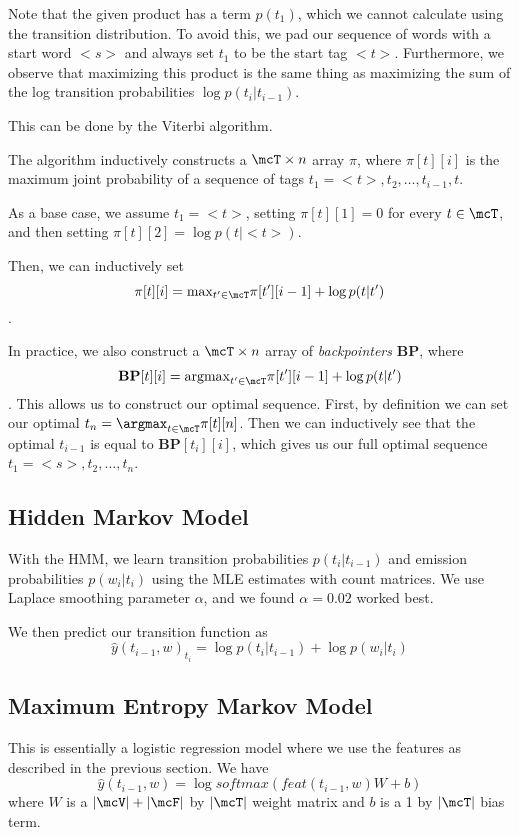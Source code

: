 \documentclass[11pt]{article}
\begin{document}
Note that the given product has a term $p(t_1)$, which we cannot calculate using the transition distribution. To avoid this, we pad our sequence of words with a start word $<s>$ and always set $t_1$ to be the start tag $<t>$. Furthermore, we observe that maximizing this product is the same thing as maximizing the sum of the log transition probabilities $\log p(t_i | t_{i-1})$. 

This can be done by the Viterbi algorithm. 

The algorithm inductively constructs a $\mcT \times n$ array $\pi$, where $\pi[t][i]$ is the maximum joint probability of a sequence of tags $t_1 = <t>, t_2, \dots, t_{i-1}, t$. 

As a base case, we assume $t_1 = <t>$, setting $\pi[t][1] = 0$ for every $t \in \mcT$, and then setting $\pi[t][2] = \log p(t | <t>)$. 

Then, we can inductively set $$\pi[t][i] = \text{max}_{t' \in \mcT} \pi[t'][i-1] + \log p(t | t')$$.

In practice, we also construct a $\mcT \times n$ array of \emph{backpointers} $\mathbf{BP}$, where $$\mathbf{BP}[t][i] = \text{argmax}_{t' \in \mcT} \pi[t'][i-1] + \log p(t | t')$$. This allows us to construct our optimal sequence. First, by definition we can set our optimal $t_n = \argmax_{t \in \mcT} \pi[t][n]$. Then we can inductively see that the optimal $t_{i-1}$ is equal to $\mathbf{BP}[t_i][i]$, which gives us our full optimal sequence $t_1 = <s>, t_2, \dots, t_n$. 

\subsection{Hidden Markov Model}

With the HMM, we learn transition probabilities $p(t_i | t_{i-1})$ and emission probabilities $p(w_i | t_i)$ using the MLE estimates with count matrices. We use Laplace smoothing parameter $\alpha$, and we found $\alpha = 0.02$ worked best.

We then predict our transition function as
$$\widehat{y}(t_{i-1}, w)_{t_i} = \log p(t_i | t_{i-1}) + \log p(w_i | t_i)$$

\subsection{Maximum Entropy Markov Model}

This is essentially a logistic regression model where we use the features as described in the previous section. We have
$$\widehat{y}(t_{i-1}, w) = \log softmax(feat(t_{i-1}, w)W + b)$$
where $W$ is a $|\mcV| + |\mcF|$ by $|\mcT|$ weight matrix and $b$ is a 1 by $|\mcT|$ bias term.
\end{document}
